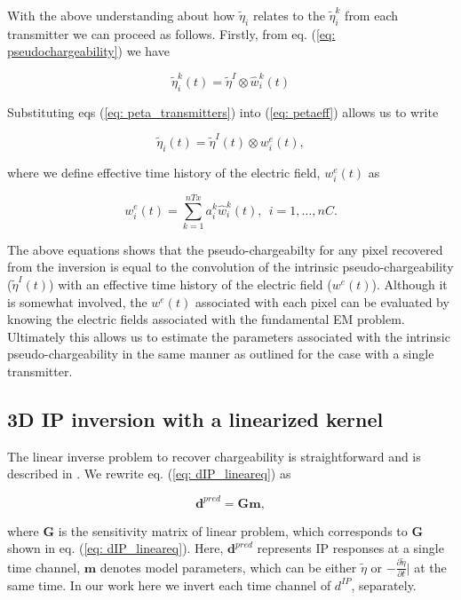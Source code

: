 \documentclass[letterpaper,11pt]{article}
\newcommand{\peta}{\tilde{\eta}}
\begin{document}
With the above understanding about how $\peta_i$ relates to the $\peta_i^k$ from each transmitter we can proceed  as follows. Firstly, from eq. (\ref{eq: pseudochargeability}) we have 
\begin{linenomath*}
\begin{equation}
  \peta_i^k(t) =\peta^I \otimes \hat{w}^{k}_i(t) 
  \label{eq: peta_transmitters}
\end{equation}
\end{linenomath*}
Substituting eqs (\ref{eq: peta_transmitters}) into (\ref{eq: petaeff}) allows us to write
\begin{linenomath*}
\begin{equation}
  \peta_i(t) = \peta^I(t) \otimes w^e_i(t),
\end{equation}
\end{linenomath*}
where we define effective time history of the electric field, $w^e_i(t)$ as 
\begin{linenomath*}
\begin{equation}
  w^e_i(t)= \sum_{k=1}^{nTx} a^k_i \hat{w}^{k}_i(t), \ \ i=1, \ldots, nC.
  \label{eq: we_eff}
\end{equation}
\end{linenomath*}

The above equations shows that the pseudo-chargeabilty for any pixel recovered from the inversion is equal to the convolution of the intrinsic pseudo-chargeability ($\peta^I(t)$) with an effective time history of the electric field ($w^e(t)$). Although it is somewhat involved, the $w^e(t)$ associated with each pixel can be evaluated by knowing the electric fields associated with the fundamental EM problem. Ultimately this allows us to estimate the parameters associated with the intrinsic pseudo-chargeability in the same manner as outlined for the case with a single transmitter. 

\subsection{3D IP inversion with a linearized kernel}
\label{appendix: 3DIPinversion}
The linear inverse problem to recover chargeability is straightforward and is described in \cite{doug1994}. 
We rewrite eq. (\ref{eq: dIP_lineareq}) as
\begin{linenomath*}
\begin{equation}
  \mathbf{d}^{pred} = \mathbf{G}\mathbf{m},
  \label{eq9}
\end{equation}
\end{linenomath*}
where $\mathbf{G}$ is the  sensitivity matrix of linear problem, which corresponds to $\mathbf{G}$ shown in eq. (\ref{eq: dIP_lineareq}). 
Here, $\mathbf{d}^{pred}$ represents IP responses at a single time channel, $\mathbf{m}$ denotes model parameters, which can be either $\peta$ or $-\frac{\partial \peta}{\partial t}\big|$ at the same time. 
In our work here we invert each time channel of $d^{IP}$, separately. 
\end{document}
